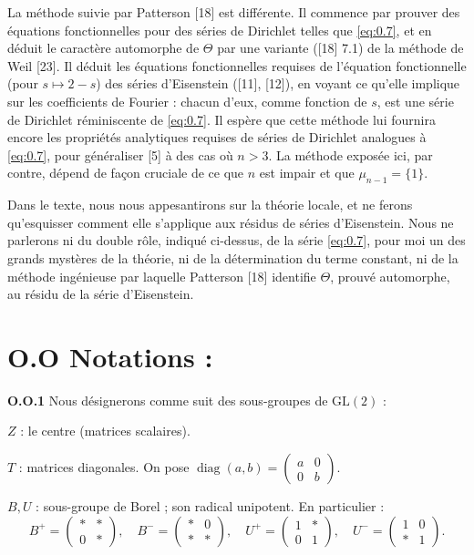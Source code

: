 \documentclass[12pt,a4paper]{article}
\theoremstyle{plain}
\theoremstyle{definition}
\theoremstyle{remark}
\DeclareMathOperator{\diag}{diag}
\begin{document}
La méthode suivie par Patterson [18] est différente. Il commence par prouver des équations fonctionnelles pour des séries de Dirichlet telles que \eqref{eq:0.7}, et en déduit le caractère automorphe de $\Theta$ par une variante ([18] 7.1) de la méthode de Weil [23]. Il déduit les équations fonctionnelles requises de l'équation fonctionnelle (pour $s \mapsto 2 - s$) des séries d'Eisenstein ([11], [12]), en voyant ce qu'elle implique sur les coefficients de Fourier : chacun d'eux, comme fonction de $s$, est une série de Dirichlet réminiscente de \eqref{eq:0.7}. Il espère que cette méthode lui fournira encore les propriétés analytiques requises de séries de Dirichlet analogues à \eqref{eq:0.7}, pour généraliser [5] à des cas où $n > 3$. La méthode exposée ici, par contre, dépend de façon cruciale de ce que $n$ est impair et que $\mu_{n-1} = \{1\}$.

Dans le texte, nous nous appesantirons sur la théorie locale, et ne ferons qu'esquisser comment elle s'applique aux résidus de séries d'Eisenstein. Nous ne parlerons ni du double rôle, indiqué ci-dessus, de la série \eqref{eq:0.7}, pour moi un des grands mystères de la théorie, ni de la détermination du terme constant, ni de la méthode ingénieuse par laquelle Patterson [18] identifie $\Theta$, prouvé automorphe, au résidu de la série d'Eisenstein.


\section*{O.O Notations :}

\textbf{O.O.1} Nous désignerons comme suit des sous-groupes de $\mathrm{GL}(2)$ :

$Z$ : le centre (matrices scalaires).

$T$ : matrices diagonales. On pose $\diag(a, b) = \begin{pmatrix} a & 0 \\ 0 & b \end{pmatrix}$.

$B, U$ : sous-groupe de Borel ; son radical unipotent. En particulier :
\[
B^+ = \begin{pmatrix} * & * \\ 0 & * \end{pmatrix}, \quad B^- = \begin{pmatrix} * & 0 \\ * & * \end{pmatrix}, \quad U^+ = \begin{pmatrix} 1 & * \\ 0 & 1 \end{pmatrix}, \quad U^- = \begin{pmatrix} 1 & 0 \\ * & 1 \end{pmatrix}.
\]
\end{document}
